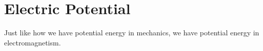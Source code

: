 \chapter{Electric Potential}
	
Just like how we have potential energy in mechanics, we have potential energy in electromagnetism.